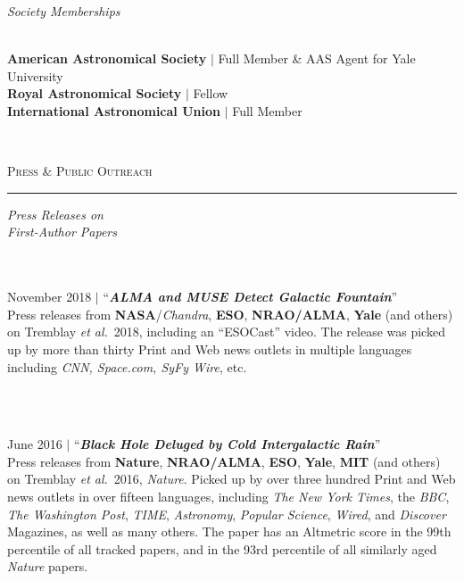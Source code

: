 \documentclass[11pt]{article}
\makeatletter
\def\vhrulefill#1{\leavevmode\leaders\hrule\@height#1\hfill \kern\z@}
\makeatother
\begin{document}
\vspace{4mm}


\hspace{2.5mm} \parbox{1.5in}{\textit{Society Memberships \\\\}} \parbox{5.15in}{ \textbf{American Astronomical Society} $|$ Full Member \& AAS Agent for Yale University \\ \textbf{Royal Astronomical Society} $|$ Fellow \\ \textbf{International Astronomical Union} $|$ Full Member}\\

\vspace{4mm}

\textsc{Press \& Public Outreach} \vhrulefill{0.4pt}

\vspace{4mm}

\hspace{2.5mm} \parbox{1.5in}{\textit{Press Releases on \\ First-Author Papers \\ \\ \\}}
\parbox{5.15in}{
November 2018 $|$ ``\textit{\textbf{ALMA and MUSE Detect Galactic Fountain}}'' \\ Press releases from \textbf{NASA}/\textit{Chandra}, \textbf{ESO}, \textbf{NRAO/ALMA}, \textbf{Yale} (and others) on Tremblay \textit{et al.}~2018, including an ``ESOCast'' video. The release was picked up by more than thirty Print and Web news outlets in multiple languages including \textit{CNN, Space.com, SyFy Wire}, etc.}\\ \\

\hspace{42mm} \parbox{5.15in}{June 2016 $|$ ``\textit{\textbf{Black Hole Deluged by Cold Intergalactic Rain}}'' \\ Press releases from \textbf{Nature}, \textbf{NRAO/ALMA}, \textbf{ESO}, \textbf{Yale}, \textbf{MIT} (and others) on Tremblay \textit{et al.}~2016, \textit{Nature}. Picked up by over three hundred Print and Web news outlets in over fifteen languages, including \textit{The New York Times}, the \textit{BBC}, \textit{The Washington Post}, \textit{TIME}, \textit{Astronomy}, \textit{Popular Science}, \textit{Wired}, and \textit{Discover} Magazines, as well as many others. The paper has an Altmetric score in the 99th percentile of all tracked papers, and in the 93rd percentile of all similarly aged \textit{Nature} papers. }\\ \\
\end{document}

